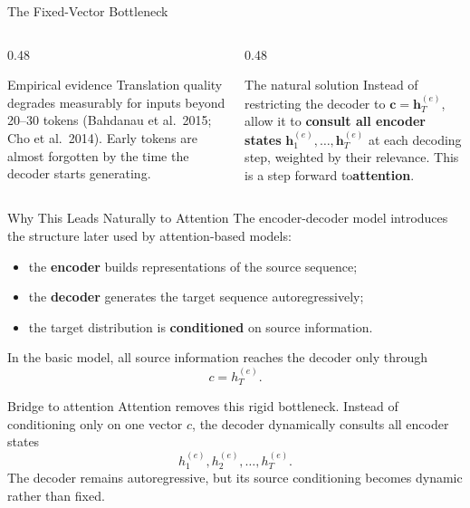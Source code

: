 \documentclass[aspectratio=169]{beamer}
\begin{document}
\begin{frame}{The Fixed-Vector Bottleneck}
\vspace{0.15cm}
\begin{columns}[T]
\begin{column}{0.48\textwidth}
\begin{block}{Empirical evidence}
Translation quality degrades measurably for inputs beyond 20--30 tokens
(Bahdanau et al.\ 2015; Cho et al.\ 2014).
Early tokens are almost forgotten by the time the decoder starts generating.
\end{block}
\end{column}
\begin{column}{0.48\textwidth}
\begin{block}{The natural solution}
Instead of restricting the decoder to $\bm{c} = \bm{h}_T^{(e)}$, allow it to
\textbf{consult all encoder states} $\bm{h}_1^{(e)}, \ldots, \bm{h}_T^{(e)}$
at each decoding step, weighted by their relevance.
This is a step forward to\textbf{attention}.
\end{block}
\end{column}
\end{columns}
\end{frame}
%
%
\begin{frame}{Why This Leads Naturally to Attention}
\small
The encoder-decoder model introduces the structure later used by attention-based models:
\begin{itemize}
  \item the \textbf{encoder} builds representations of the source sequence;
  \item the \textbf{decoder} generates the target sequence autoregressively;
  \item the target distribution is \textbf{conditioned} on source information.
\end{itemize}

\vspace{0.15cm}
In the basic model, all source information reaches the decoder only through
\[
  c = h^{(e)}_T.
\]

\begin{alertblock}{Bridge to attention}
Attention removes this rigid bottleneck. Instead of conditioning only on one vector $c$, the decoder dynamically consults all encoder states
\[
  h^{(e)}_1, h^{(e)}_2, \ldots, h^{(e)}_T.
\]
The decoder remains autoregressive, but its source conditioning becomes dynamic rather than fixed.
\end{alertblock}
\end{frame}%
%
\end{document}
